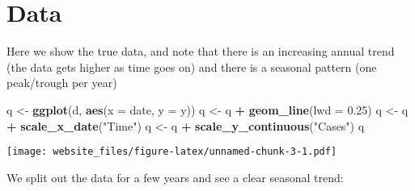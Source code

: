 \documentclass[]{book}
\newenvironment{Shaded}{\begin{snugshade}}{\end{snugshade}}
\newcommand{\KeywordTok}[1]{\textcolor[rgb]{0.13,0.29,0.53}{\textbf{#1}}}
\newcommand{\DataTypeTok}[1]{\textcolor[rgb]{0.13,0.29,0.53}{#1}}
\newcommand{\DecValTok}[1]{\textcolor[rgb]{0.00,0.00,0.81}{#1}}
\newcommand{\FloatTok}[1]{\textcolor[rgb]{0.00,0.00,0.81}{#1}}
\newcommand{\StringTok}[1]{\textcolor[rgb]{0.31,0.60,0.02}{#1}}
\newcommand{\OperatorTok}[1]{\textcolor[rgb]{0.81,0.36,0.00}{\textbf{#1}}}
\newcommand{\NormalTok}[1]{#1}
\begin{document}
\section{Data}\label{data}

Here we show the true data, and note that there is an increasing annual
trend (the data gets higher as time goes on) and there is a seasonal
pattern (one peak/trough per year)

\begin{Shaded}
\begin{Highlighting}[]
\NormalTok{q <-}\StringTok{ }\KeywordTok{ggplot}\NormalTok{(d, }\KeywordTok{aes}\NormalTok{(}\DataTypeTok{x =}\NormalTok{ date, }\DataTypeTok{y =}\NormalTok{ y))}
\NormalTok{q <-}\StringTok{ }\NormalTok{q }\OperatorTok{+}\StringTok{ }\KeywordTok{geom_line}\NormalTok{(}\DataTypeTok{lwd =} \FloatTok{0.25}\NormalTok{)}
\NormalTok{q <-}\StringTok{ }\NormalTok{q }\OperatorTok{+}\StringTok{ }\KeywordTok{scale_x_date}\NormalTok{(}\StringTok{"Time"}\NormalTok{)}
\NormalTok{q <-}\StringTok{ }\NormalTok{q }\OperatorTok{+}\StringTok{ }\KeywordTok{scale_y_continuous}\NormalTok{(}\StringTok{"Cases"}\NormalTok{)}
\NormalTok{q}
\end{Highlighting}
\end{Shaded}

\texttt{[image: website\_files/figure-latex/unnamed-chunk-3-1.pdf]}

We split out the data for a few years and see a clear seasonal trend:

\begin{Shaded}
\end{Shaded}
\end{document}
